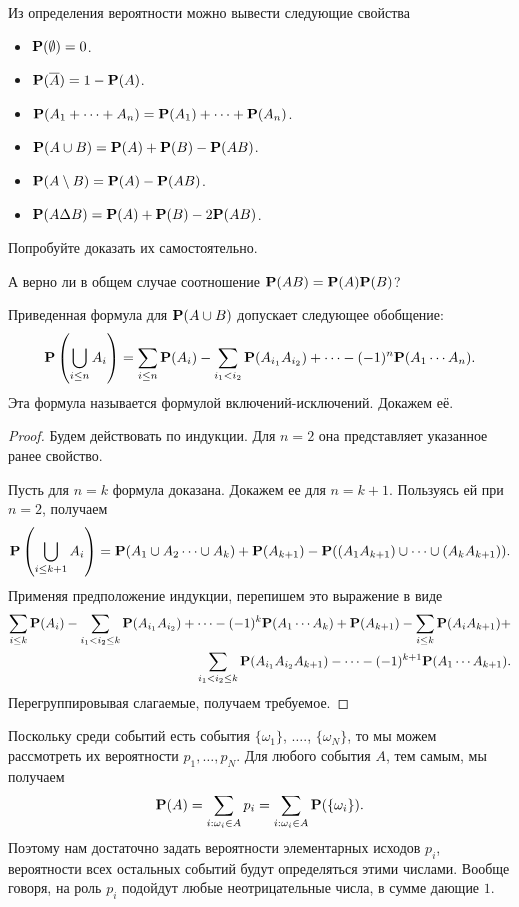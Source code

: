 \documentclass[11 pt,russian]{article}
\begin{document}
Из определения вероятности можно вывести следующие свойства
\begin{itemize}
\item ${\bf P}(\emptyset) = 0$.
\item ${\bf P}(\overline{A}) = 1 - {\bf P}(A)$.
\item ${\bf P}(A_1+ \dotsb + A_n) = {\bf P}(A_1) + \dotsb + {\bf P}(A_n)$.
\item ${\bf P}(A\cup B) = {\bf P}(A) + {\bf P}(B) - {\bf P}(AB)$.
\item ${\bf P}(A\setminus B) = {\bf P}(A) - {\bf P}(AB)$.
\item ${\bf P}(A\Delta B) = {\bf P}(A) + {\bf P}(B) - 2{\bf P}(AB)$.
\end{itemize}
Попробуйте доказать их самостоятельно. 
\begin{Que}
А верно ли в общем случае соотношение ${\bf P}(AB) = {\bf P}(A) {\bf P}(B)$?
\end{Que}
Приведенная формула для ${\bf P}(A\cup B)$ допускает следующее обобщение:
$$
{\bf P}\left(\bigcup_{i\le n} A_i\right) = \sum_{i\le n} {\bf P}(A_i) - \sum_{i_1< i_2} {\bf P}(A_{i_1} A_{i_2}) + \cdots - (-1)^n{\bf P}(A_1 \cdots A_n).
$$
Эта формула называется формулой включений-исключений. Докажем её.
\begin{proof}
Будем действовать по индукции. Для $n=2$ она представляет указанное ранее свойство.

Пусть для $n=k$ формула доказана. Докажем ее для $n=k+1$. Пользуясь ей при $n=2$, получаем
$$
{\bf P}\left(\bigcup_{i\le k+1} A_i\right) = 
{\bf P}(A_1\cup A_2 \dotsm \cup A_{k}) + {\bf P}(A_{k+1}) - {\bf P}((A_1 A_{k+1})\cup \dotsm \cup (A_{k}A_{k+1})).
$$
Применяя предположение индукции, перепишем это выражение в виде
\begin{eqnarray*}
 \sum_{i\le k} {\bf P}(A_i) - \sum_{i_1< i_2\le k} {\bf P}(A_{i_1} A_{i_2})  + \dotsb - (-1)^{k} {\bf P}(A_1 \dotsm A_{k}) + {\bf P}(A_{k+1}) - 
 \sum_{i\le k} {\bf P}(A_i A_{k+1}) +\\
  \sum_{i_1< i_2\le k} {\bf P}(A_{i_1} A_{i_2} A_{k+1})  - \dotsb - (-1)^{k+1} {\bf P}(A_1 \dotsm A_{k+1}).
\end{eqnarray*}
Перегруппировывая слагаемые, получаем требуемое.
\end{proof}
Поскольку среди событий есть события $\{\omega_1\}$, $\dotsc$., $\{\omega_N\}$, то мы можем рассмотреть их вероятности $p_1,\dotsc, p_N$. Для любого события $A$, тем самым, мы получаем
$$
{\bf P}(A) = \sum_{i: \omega_i\in A} p_i = \sum_{i: \omega_i\in A} {\bf P}(\{\omega_i\}).
$$
Поэтому нам достаточно задать вероятности элементарных исходов $p_i$, вероятности всех остальных событий будут определяться этими числами. Вообще говоря, на роль $p_i$ подойдут любые неотрицательные числа, в сумме дающие $1$.
\end{document}
